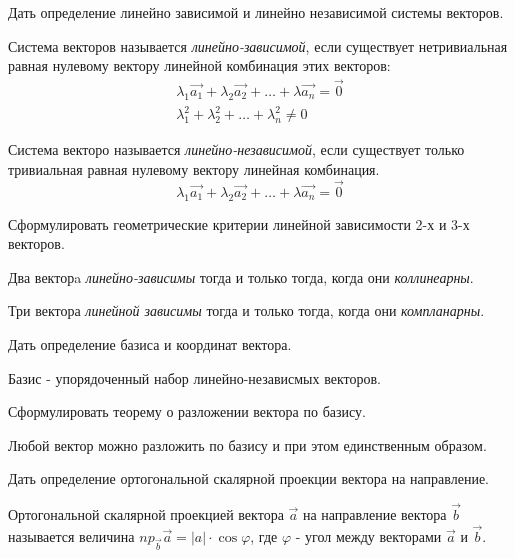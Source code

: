 \begin{question}
  Дать определение линейно зависимой и линейно независимой системы векторов.
\end{question}
\begin{answer}
  Система векторов называется \textit{линейно-зависимой}, если существует нетривиальная равная нулевому вектору линейной комбинация этих векторов:
  \begin{gather*}
    \lambda_1 \vec{a_1} + \lambda_2 \vec{a_2} + \ldots + \lambda \vec{a_n} = \vec{0} \\
    \lambda_1^2 + \lambda_2^2 + \ldots + \lambda_n^2 \neq 0
  \end{gather*}

  Система векторо называется \textit{линейно-независимой}, если существует только тривиальная равная нулевому вектору линейная комбинация.
  \[
    \lambda_1 \vec{a_1} + \lambda_2 \vec{a_2} + \ldots + \lambda \vec{a_n} = \vec{0}
  \] 
\end{answer}

\begin{question}
  Сформулировать геометрические критерии линейной зависимости 2-х и 3-х векторов.
\end{question}
\begin{answer}
  Два векторa \textit{линейно-зависимы} тогда и только тогда, когда они \textit{коллинеарны}.

  Три вектора \textit{линейной зависимы} тогда и только тогда, когда они \textit{компланарны}. 
\end{answer}

\begin{question}
  Дать определение базиса и координат вектора.
\end{question}
\begin{answer}
  Базис - упорядоченный набор линейно-независмых векторов. 
\end{answer}

\begin{question}
  Сформулировать теорему о разложении вектора по базису. 
\end{question}
\begin{answer}
  Любой вектор можно разложить по базису и при этом единственным образом.
\end{answer}

\begin{question}
  Дать определение ортогональной скалярной проекции вектора на направление.
\end{question}
\begin{answer}
  Ортогональной скалярной проекцией вектора $\vec{a}$ на направление вектора $\vec{b}$ называется величина $np_{\vec{b}}\vec{a} = |a|\cdot \cos \varphi$, где $\varphi$ - угол между векторами $\vec{a}$ и $\vec{b}$.
\end{answer}
 
